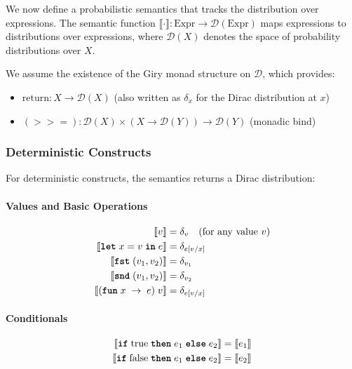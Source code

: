 We now define a probabilistic semantics that tracks the distribution over expressions. The semantic function $\llbracket \cdot \rrbracket : \text{Expr} \rightarrow \mathcal{D}(\text{Expr})$ maps expressions to distributions over expressions, where $\mathcal{D}(X)$ denotes the space of probability distributions over $X$.

We assume the existence of the Giry monad structure on $\mathcal{D}$, which provides:
\begin{itemize}
    \item $\text{return} : X \rightarrow \mathcal{D}(X)$ (also written as $\delta_x$ for the Dirac distribution at $x$)
    \item $(>>=) : \mathcal{D}(X) \times (X \rightarrow \mathcal{D}(Y)) \rightarrow \mathcal{D}(Y)$ (monadic bind)
\end{itemize}

\subsubsection{Deterministic Constructs}

For deterministic constructs, the semantics returns a Dirac distribution:

\paragraph{Values and Basic Operations}
\begin{align*}
\llbracket v \rrbracket &= \delta_v \quad \text{(for any value } v \text{)} \\
\llbracket \text{\ttfamily\bfseries let} \; x = v \; \text{\ttfamily\bfseries in} \; e \rrbracket &= \delta_{e[v/x]} \\
\llbracket \text{\ttfamily\bfseries fst} \; (v_1, v_2) \rrbracket &= \delta_{v_1} \\
\llbracket \text{\ttfamily\bfseries snd} \; (v_1, v_2) \rrbracket &= \delta_{v_2} \\
\llbracket (\text{\ttfamily\bfseries fun} \; x \; \rightarrow \; e) \; v \rrbracket &= \delta_{e[v/x]}
\end{align*}

\paragraph{Conditionals}
\begin{align*}
\llbracket \text{\ttfamily\bfseries if} \; \text{true} \; \text{\ttfamily\bfseries then} \; e_1 \; \text{\ttfamily\bfseries else} \; e_2 \rrbracket &= \llbracket e_1 \rrbracket \\
\llbracket \text{\ttfamily\bfseries if} \; \text{false} \; \text{\ttfamily\bfseries then} \; e_1 \; \text{\ttfamily\bfseries else} \; e_2 \rrbracket &= \llbracket e_2 \rrbracket
\end{align*}

